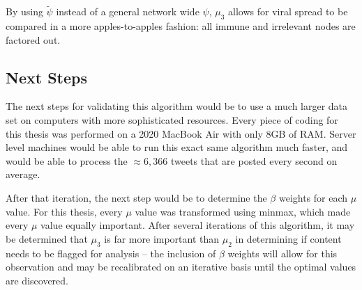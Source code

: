 \documentclass[preprint,review,12pt]{elsarticle}
\begin{document}
By using $\tilde{\psi}$ instead of a general network wide $\psi$, $\mu_3$ allows for viral spread to be compared in a more apples-to-apples fashion: all immune and irrelevant nodes are factored out. 




\subsection{Next Steps}
The next steps for validating this algorithm would be to use a much larger data set on computers with more sophisticated resources. Every piece of coding for this thesis was performed on a 2020 MacBook Air with only 8GB of RAM. Server level machines would be able to run this exact same algorithm much faster, and would be able to process the $\approx 6,366$ tweets that are posted every second on average. 

After that iteration, the next step would be to determine the $\beta$ weights for each $\mu$ value. For this thesis, every $\mu$ value was transformed using minmax, which made every $\mu$ value equally important. After several iterations of this algorithm, it may be determined that $\mu_3$ is far more important than $\mu_2$ in determining if content needs to be flagged for analysis -- the inclusion of $\beta$ weights will allow for this observation and may be recalibrated on an iterative basis until the optimal values are discovered.



\newpage
 

\end{document}
